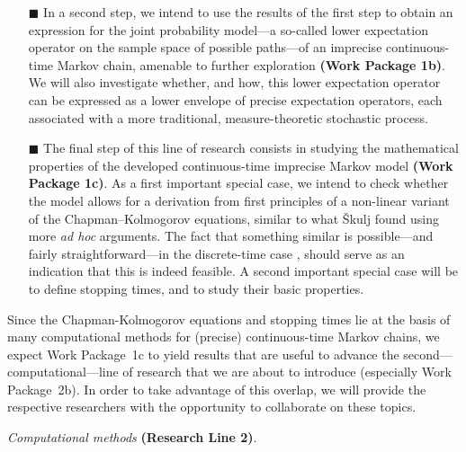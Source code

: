 \documentclass[11pt,dvipsnames,usenames,a4paper]{article}
\begin{document}
\begin{itemize}
\item[\tiny$\blacksquare$]
In a second step, we intend to use the results of the first step to obtain an expression for the joint probability model---a so-called lower expectation operator on the sample space of possible paths---of an imprecise continuous-time Markov chain, amenable to further exploration {\bf(Work Package 1b)}.
We will also investigate whether, and how, this lower expectation operator can be expressed as a lower envelope of precise expectation operators, each associated with a more traditional, measure-theoretic stochastic process.

\item[\tiny$\blacksquare$]
The final step of this line of research consists in studying the mathematical properties of the developed continuous-time imprecise Markov model {\bf(Work Package 1c)}.
As a first important special case, we intend to check whether the model allows for a derivation from first principles of a non-linear variant of the Chapman--Kolmogorov equations, similar to what \v{S}kulj \cite{skulj2015:continuous:bounds} found using more {\itshape ad hoc} arguments.
The fact that something similar is possible---and fairly straightforward---in the discrete-time case \cite{cooman2008}, should serve as an indication that this is indeed feasible. A second important special case will be to define stopping times, and to study their basic properties.\vspace{8pt}
\end{itemize}

Since the Chapman-Kolmogorov equations and stopping times lie at the basis of many computational methods for (precise) continuous-time Markov chains, we expect Work Package~1c to yield results that are useful to advance the second---computational---line of research that we are about to introduce (especially Work Package~2b). In order to take advantage of this overlap, we will provide the respective researchers with the opportunity to collaborate on these topics.


\vspace{8pt}


\emph{Computational methods} {\bf (Research Line 2)}.
\vspace{3pt}
\end{document}
